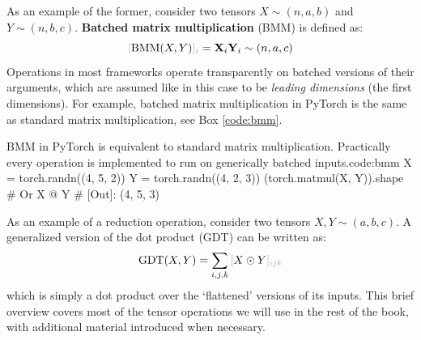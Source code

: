 As an example of the former, consider two tensors $X \sim (n,a,b)$ and $Y\sim (n,b,c)$. \textbf{Batched matrix multiplication} (BMM) is defined as:
%
\begin{equation}
\idx{\text{BMM}(X,Y)}{i} = {\mathbf{X}}_{i}{\mathbf{Y}}_{i} \sim (n, a, c)
\label{eq:bmm}
\end{equation}
%
Operations in most frameworks operate transparently on batched versions of their arguments, which are assumed like in this case to be \textit{leading dimensions} (the first dimensions). For example, batched matrix multiplication in PyTorch is the same as standard matrix multiplication, see Box \ref{code:bmm}.

\begin{mypy}{BMM in PyTorch is equivalent to standard matrix multiplication. Practically every operation is implemented to run on generically batched inputs.}{code:bmm}
X = torch.randn((4, 5, 2))
Y = torch.randn((4, 2, 3))
(torch.matmul(X, Y)).shape # Or X @ Y 
# [Out]: (4, 5, 3)
\end{mypy}
%
As an example of a reduction operation, consider two tensors $X, Y \sim (a,b,c)$. A generalized version of the dot product (GDT) can be written as:
%
$$
\text{GDT}(X,Y) =\sum_{i,j,k} \idx{X \odot Y}{ijk}
$$
%
which is simply a dot product over the `flattened' versions of its inputs. This brief overview covers most of the tensor operations we will use in the rest of the book, with additional material introduced when necessary.
%
